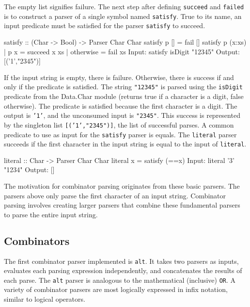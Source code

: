 \documentclass[11pt]{article}
\begin{document}
The empty list signifies failure. The next step after defining \texttt{succeed} and \texttt{failed} is to construct a parser of a single symbol named \texttt{satisfy}. True to its name, an input predicate must be satisfied for the parser \texttt{satisfy} to succeed.

\hspace{2cm}\begin{verbbox}
satisfy :: (Char -> Bool) -> Parser Char Char
satisfy p [] = fail []
satisfy p (x:xs) | p x = succeed x xs
                 | otherwise = fail xs
Input:  satisfy isDigit "12345"
Output: [('1',"2345")]
\end{verbbox}
\theverbbox

If the input string is empty, there is failure. Otherwise, there is success if and only if the predicate is satisfied. The string \texttt{"12345"} is parsed using the \texttt{isDigit} predicate from the Data.Char module (returns true if a character is a digit, false otherwise). The predicate is satisfied because the first character is a digit. The output is \texttt{'1'}, and the unconsumed input is \texttt{"2345"}. This success is represented by the singleton list \texttt{[('1',"2345")]}, the list of successful parses. A common predicate to use as input for the \texttt{satisfy} parser is equals. The \texttt{literal} parser succeeds if the first character in the input string is equal to the input of \texttt{literal}. 

\hspace{2cm}\begin{verbbox}
literal :: Char -> Parser Char Char
literal x = satisfy (==x)
Input:  literal '3' "1234" 
Output: []
\end{verbbox}
\theverbbox

The motivation for combinator parsing originates from these basic parsers. The parsers above only parse the first character of an input string. Combinator parsing involves creating larger parsers that combine these fundamental parsers to parse the entire input string.

\subsection{Combinators}

The first combinator parser implemented is \texttt{alt}. It takes two parsers as inputs, evaluates each parsing expression independently, and concatenates the results of each parse. The \texttt{alt} parser is analogous to the mathematical (inclusive) \texttt{OR}. A variety of combinator parsers are most logically expressed in infix notation, similar to logical operators.
\end{document}
